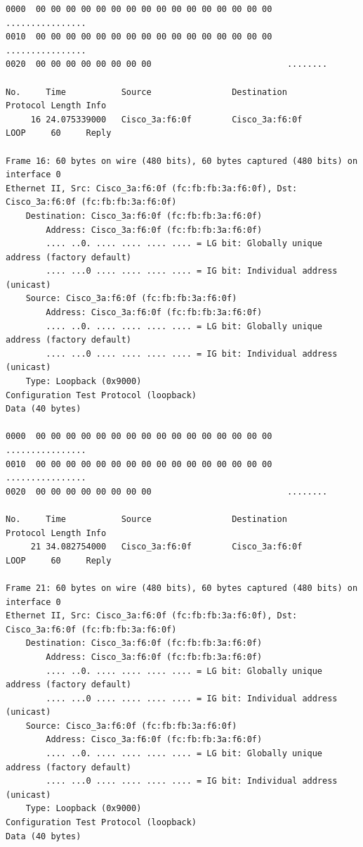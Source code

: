 \documentclass[a4paper,11pt]{article}
\begin{document}
\begin{lstlisting}
0000  00 00 00 00 00 00 00 00 00 00 00 00 00 00 00 00   ................
0010  00 00 00 00 00 00 00 00 00 00 00 00 00 00 00 00   ................
0020  00 00 00 00 00 00 00 00                           ........

No.     Time           Source                Destination           Protocol Length Info
     16 24.075339000   Cisco_3a:f6:0f        Cisco_3a:f6:0f        LOOP     60     Reply

Frame 16: 60 bytes on wire (480 bits), 60 bytes captured (480 bits) on interface 0
Ethernet II, Src: Cisco_3a:f6:0f (fc:fb:fb:3a:f6:0f), Dst: Cisco_3a:f6:0f (fc:fb:fb:3a:f6:0f)
    Destination: Cisco_3a:f6:0f (fc:fb:fb:3a:f6:0f)
        Address: Cisco_3a:f6:0f (fc:fb:fb:3a:f6:0f)
        .... ..0. .... .... .... .... = LG bit: Globally unique address (factory default)
        .... ...0 .... .... .... .... = IG bit: Individual address (unicast)
    Source: Cisco_3a:f6:0f (fc:fb:fb:3a:f6:0f)
        Address: Cisco_3a:f6:0f (fc:fb:fb:3a:f6:0f)
        .... ..0. .... .... .... .... = LG bit: Globally unique address (factory default)
        .... ...0 .... .... .... .... = IG bit: Individual address (unicast)
    Type: Loopback (0x9000)
Configuration Test Protocol (loopback)
Data (40 bytes)

0000  00 00 00 00 00 00 00 00 00 00 00 00 00 00 00 00   ................
0010  00 00 00 00 00 00 00 00 00 00 00 00 00 00 00 00   ................
0020  00 00 00 00 00 00 00 00                           ........

No.     Time           Source                Destination           Protocol Length Info
     21 34.082754000   Cisco_3a:f6:0f        Cisco_3a:f6:0f        LOOP     60     Reply

Frame 21: 60 bytes on wire (480 bits), 60 bytes captured (480 bits) on interface 0
Ethernet II, Src: Cisco_3a:f6:0f (fc:fb:fb:3a:f6:0f), Dst: Cisco_3a:f6:0f (fc:fb:fb:3a:f6:0f)
    Destination: Cisco_3a:f6:0f (fc:fb:fb:3a:f6:0f)
        Address: Cisco_3a:f6:0f (fc:fb:fb:3a:f6:0f)
        .... ..0. .... .... .... .... = LG bit: Globally unique address (factory default)
        .... ...0 .... .... .... .... = IG bit: Individual address (unicast)
    Source: Cisco_3a:f6:0f (fc:fb:fb:3a:f6:0f)
        Address: Cisco_3a:f6:0f (fc:fb:fb:3a:f6:0f)
        .... ..0. .... .... .... .... = LG bit: Globally unique address (factory default)
        .... ...0 .... .... .... .... = IG bit: Individual address (unicast)
    Type: Loopback (0x9000)
Configuration Test Protocol (loopback)
Data (40 bytes)


\end{lstlisting}
\end{document}
